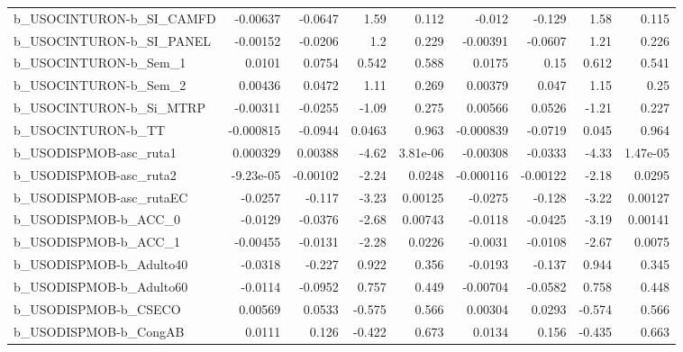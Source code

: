 \begin{tabular}{lrrrrrrrr}
b\_USOCINTURON-b\_SI\_CAMFD   &    -0.00637 &      -0.0647 &      1.59 &    0.112 &     -0.012 &      -0.129 &         1.58 &         0.115 \\
b\_USOCINTURON-b\_SI\_PANEL   &    -0.00152 &      -0.0206 &       1.2 &    0.229 &   -0.00391 &     -0.0607 &         1.21 &         0.226 \\
b\_USOCINTURON-b\_Sem\_1      &      0.0101 &       0.0754 &     0.542 &    0.588 &     0.0175 &        0.15 &        0.612 &         0.541 \\
b\_USOCINTURON-b\_Sem\_2      &     0.00436 &       0.0472 &      1.11 &    0.269 &    0.00379 &       0.047 &         1.15 &          0.25 \\
b\_USOCINTURON-b\_Si\_MTRP    &    -0.00311 &      -0.0255 &     -1.09 &    0.275 &    0.00566 &      0.0526 &        -1.21 &         0.227 \\
b\_USOCINTURON-b\_TT         &   -0.000815 &      -0.0944 &    0.0463 &    0.963 &  -0.000839 &     -0.0719 &        0.045 &         0.964 \\
b\_USODISPMOB-asc\_ruta1     &    0.000329 &      0.00388 &     -4.62 & 3.81e-06 &   -0.00308 &     -0.0333 &        -4.33 &      1.47e-05 \\
b\_USODISPMOB-asc\_ruta2     &   -9.23e-05 &     -0.00102 &     -2.24 &   0.0248 &  -0.000116 &    -0.00122 &        -2.18 &        0.0295 \\
b\_USODISPMOB-asc\_rutaEC    &     -0.0257 &       -0.117 &     -3.23 &  0.00125 &    -0.0275 &      -0.128 &        -3.22 &       0.00127 \\
b\_USODISPMOB-b\_ACC\_0       &     -0.0129 &      -0.0376 &     -2.68 &  0.00743 &    -0.0118 &     -0.0425 &        -3.19 &       0.00141 \\
b\_USODISPMOB-b\_ACC\_1       &    -0.00455 &      -0.0131 &     -2.28 &   0.0226 &    -0.0031 &     -0.0108 &        -2.67 &        0.0075 \\
b\_USODISPMOB-b\_Adulto40    &     -0.0318 &       -0.227 &     0.922 &    0.356 &    -0.0193 &      -0.137 &        0.944 &         0.345 \\
b\_USODISPMOB-b\_Adulto60    &     -0.0114 &      -0.0952 &     0.757 &    0.449 &   -0.00704 &     -0.0582 &        0.758 &         0.448 \\
b\_USODISPMOB-b\_CSECO       &     0.00569 &       0.0533 &    -0.575 &    0.566 &    0.00304 &      0.0293 &       -0.574 &         0.566 \\
b\_USODISPMOB-b\_CongAB      &      0.0111 &        0.126 &    -0.422 &    0.673 &     0.0134 &       0.156 &       -0.435 &         0.663 \\

\end{tabular}
